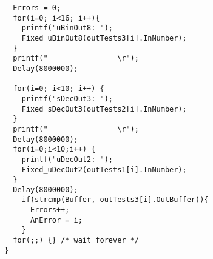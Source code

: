 \documentclass[11pt]{article}
\begin{document}
\begin{verbatim}
  Errors = 0;
  for(i=0; i<16; i++){
    printf("uBinOut8: ");
    Fixed_uBinOut8(outTests3[i].InNumber);
  }
  printf("________________\r");
  Delay(8000000);

  for(i=0; i<10; i++) {
	printf("sDecOut3: ");
	Fixed_sDecOut3(outTests2[i].InNumber);
  }
  printf("________________\r");
  Delay(8000000);
  for(i=0;i<10;i++) {
	printf("uDecOut2: ");
	Fixed_uDecOut2(outTests1[i].InNumber);
  }
  Delay(8000000);
    if(strcmp(Buffer, outTests3[i].OutBuffer)){
      Errors++;
      AnError = i;
    }	
  for(;;) {} /* wait forever */
}

\end{verbatim}
\end{document}

